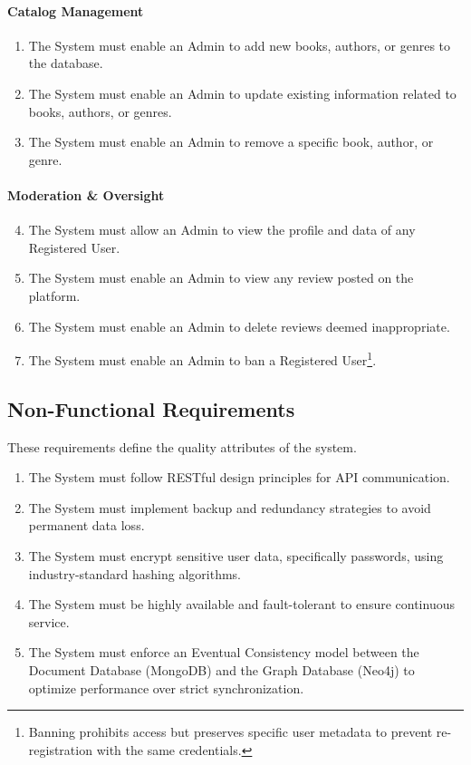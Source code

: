 \paragraph{Catalog Management}
\begin{enumerate}
    \item The System must enable an Admin to add new books, authors, or genres to the database.
    \item The System must enable an Admin to update existing information related to books, authors, or genres.
    \item The System must enable an Admin to remove a specific book, author, or genre.
\end{enumerate}

\paragraph{Moderation \& Oversight}
\begin{enumerate}
    \setcounter{enumi}{3}
    \item The System must allow an Admin to view the profile and data of any Registered User.
    \item The System must enable an Admin to view any review posted on the platform.
    \item The System must enable an Admin to delete reviews deemed inappropriate.
    \item The System must enable an Admin to ban a Registered User\footnote{Banning prohibits access but preserves specific user metadata to prevent re-registration with the same credentials.}.
\end{enumerate}

\subsection{Non-Functional Requirements}
These requirements define the quality attributes of the system.

\begin{enumerate}
    \item The System must follow RESTful design principles for API communication.
    \item The System must implement backup and redundancy strategies to avoid permanent data loss.
    \item The System must encrypt sensitive user data, specifically passwords, using industry-standard hashing algorithms.
    \item The System must be highly available and fault-tolerant to ensure continuous service.
    \item The System must enforce an Eventual Consistency model between the Document Database (MongoDB) and the Graph Database (Neo4j) to optimize performance over strict synchronization.
\end{enumerate}

